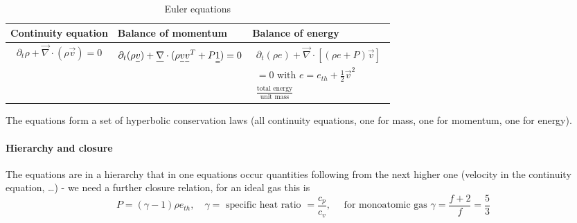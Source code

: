 \begin{table}[!htb]
    \centering
    \begin{tabular}{|p{}|p{}|p{}|}
        \hline
        \textcolor{blue1}{Continuity equation} & \textcolor{blue1}{Balance of momentum} &  \textcolor{blue1}{Balance of energy} \\
        \hline
        \begin{equation}
            \partial_t \rho + \vec{\nabla} \cdot (\rho \vec{v}) = 0
        \end{equation} &
        \begin{equation}
            \partial_t (\rho \vec{v}) + \vec{\nabla} \cdot (\rho \vec{v}\vec{v}^T + P\mat{1}) = 0
        \end{equation} &
        \begin{equation}
            \begin{gathered}
                \partial_t (\rho e) + \vec{\nabla} \cdot \left[(\rho e + P)\vec{v} \right]\\ = 0 
                \text{ with } e = e_{th} + \frac{1}{2} \vec{v}^2 \\
                \frac{\text{total energy}}{\text{unit mass}}
            \end{gathered}
        \end{equation} \\
        \hline
    \end{tabular}
    \caption{Euler equations}
    \label{tab:euler_eq}
\end{table}
The equations form a set of hyperbolic conservation laws (all continuity equations, one for mass, one for momentum, one for energy).
\paragraph{Hierarchy and closure} The equations are in a hierarchy that in one 
equations occur quantities following from the next higher one (velocity in the 
continuity equation, …) - we need a further closure relation, for an ideal gas this is
\begin{equation}
    P = (\gamma - 1) \rho e_{th}, \quad \gamma = \text{ specific heat ratio } = \frac{c_p}{c_v}, \quad \text{ for monoatomic gas } \gamma = \frac{f+2}{f} = \frac{5}{3}
\end{equation}



